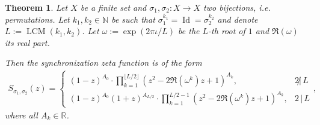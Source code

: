 \documentclass[oneside]{amsart}
\def\N{\mathbb{N}}
\def\R{\mathbb{R}}
\def\Id{\operatorname{Id}}
\def\LCM{\operatorname{LCM}}
\newtheorem{thm}{Theorem}
\begin{document}
\begin{thm} \label{thm:synchronization-zeta-form-bijections-finite}
  Let $X$ be a finite set and $\sigma_1, \sigma_2: X \to X$ two bijections, i.e. permutations.
  Let $k_1, k_2 \in \N$ be such that $\sigma_1^{k_1} = \Id = \sigma_2^{k_2}$
  and denote $L := \LCM(k_1,k_2)$.
  Let $\omega := \exp(2\pi\iota/L)$ be the $L$-th root of $1$ and $\Re(\omega)$ its real part.

  Then the synchronization zeta function is of the form
  \begin{align} \label{eq:synchronization-permutations}
    S_{\sigma_1,\sigma_2}(z) = \begin{cases}
      (1-z)^{A_0} \cdot \prod_{k=1}^{\lfloor L/2 \rfloor} \left( z^2 - 2\Re(\omega^k)z+1 \right)^{A_k}, & 2 \!\not|\, L \\[1ex]
      (1-z)^{A_0}(1+z)^{A_{L/2}} \cdot \prod_{k=1}^{L/2-1} \left( z^2 - 2\Re(\omega^k)z+1 \right)^{A_k}, & 2 \,\vert\, L
    \end{cases},
  \end{align}
  where all $A_k \in \R$.
\end{thm}
\end{document}
